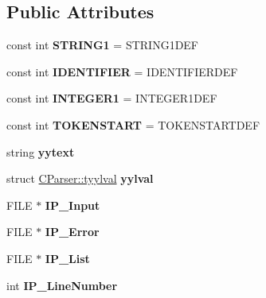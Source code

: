 \subsection*{Public Attributes}
\begin{DoxyCompactItemize}
\item 
\mbox{\label{class_c_parser_add222634f83e6f98eb0edfeb1b699b1c}} 
const int {\bfseries S\+T\+R\+I\+N\+G1} = S\+T\+R\+I\+N\+G1\+D\+EF
\item 
\mbox{\label{class_c_parser_a4240e030456438ce9fa48ca0cdf579db}} 
const int {\bfseries I\+D\+E\+N\+T\+I\+F\+I\+ER} = I\+D\+E\+N\+T\+I\+F\+I\+E\+R\+D\+EF
\item 
\mbox{\label{class_c_parser_aac3891f36c14b206d0b11b7c64ff8ace}} 
const int {\bfseries I\+N\+T\+E\+G\+E\+R1} = I\+N\+T\+E\+G\+E\+R1\+D\+EF
\item 
\mbox{\label{class_c_parser_ab12f100969854503712578b104fab6e1}} 
const int {\bfseries T\+O\+K\+E\+N\+S\+T\+A\+RT} = T\+O\+K\+E\+N\+S\+T\+A\+R\+T\+D\+EF
\item 
\mbox{\label{class_c_parser_ab684307c3328c44a4b41f4914f167966}} 
string {\bfseries yytext}
\item 
\mbox{\label{class_c_parser_a3c6622dea72f180fab640c870eacae5e}} 
struct \mbox{\hyperlink{struct_c_parser_1_1tyylval}{C\+Parser\+::tyylval}} {\bfseries yylval}
\item 
\mbox{\label{class_c_parser_a35edbabe98679968af2cb9b82049b22a}} 
F\+I\+LE $\ast$ {\bfseries I\+P\+\_\+\+Input}
\item 
\mbox{\label{class_c_parser_ab2cb76a37c65a8b9241da4e01f9b352d}} 
F\+I\+LE $\ast$ {\bfseries I\+P\+\_\+\+Error}
\item 
\mbox{\label{class_c_parser_a7ace8d8e49ab5fab8698250dd3ccc903}} 
F\+I\+LE $\ast$ {\bfseries I\+P\+\_\+\+List}
\item 
\mbox{\label{class_c_parser_ae53c34abf654eddf39609c83604072bc}} 
int {\bfseries I\+P\+\_\+\+Line\+Number}

\end{DoxyCompactItemize}
